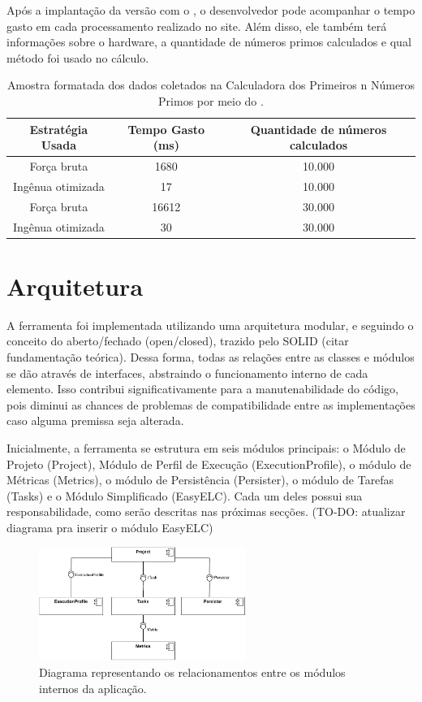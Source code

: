 \documentclass[12pt]{tcc}
\begin{document}
Após a implantação da versão com o , o desenvolvedor pode acompanhar o tempo gasto em cada processamento realizado no site.
Além disso, ele também terá informações sobre o hardware, a quantidade de números primos calculados e qual método foi usado no cálculo.

\begin{table}[!h]
    \centering
    \caption{Amostra formatada dos dados coletados na Calculadora dos Primeiros n Números Primos por meio do .}
    \begin{tabular}{|c|c|c|}
        \hline
        Estratégia Usada & Tempo Gasto (ms) & Quantidade de números calculados\\
        \hline
		Força bruta & 1680 & 10.000 \\
        \hline
		Ingênua otimizada & 17 & 10.000 \\
        \hline
		Força bruta & 16612 & 30.000 \\
        \hline
        Ingênua otimizada & 30 & 30.000 \\
        \hline
    \end{tabular}
\end{table}

\section{Arquitetura}
\label{cap:diagrama_de_arq}

A ferramenta foi implementada utilizando uma arquitetura modular, e seguindo o conceito do aberto/fechado (open/closed), trazido pelo SOLID (citar fundamentação teórica). Dessa forma, todas as relações entre as classes e módulos se dão através de interfaces, abstraindo o funcionamento interno de cada elemento. Isso contribui significativamente para a manutenabilidade do código, pois diminui as chances de problemas de compatibilidade entre as implementações caso alguma premissa seja alterada.

Inicialmente, a ferramenta se estrutura em seis módulos principais: o Módulo de Projeto (Project), Módulo de Perfil de Execução (ExecutionProfile), o módulo de Métricas (Metrics), o módulo de Persistência (Persister), o módulo de Tarefas (Tasks) e o Módulo Simplificado (EasyELC). Cada um deles possui sua responsabilidade, como serão descritas nas próximas secções. (TO-DO: atualizar diagrama pra inserir o módulo EasyELC)


\begin{figure}[!ht]
	\centering
	\includegraphics[width=0.6\textwidth]{figures/diagramaarquiteturaelchupacabra.pdf}
	\caption{Diagrama representando os relacionamentos entre os módulos internos da aplicação.}
	\label{fig:diagrama-arquitetura}
\end{figure}
\end{document}
